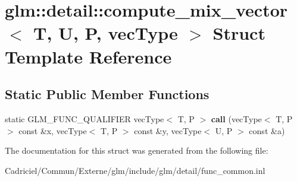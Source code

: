 \hypertarget{structglm_1_1detail_1_1compute__mix__vector}{}\section{glm\+:\+:detail\+:\+:compute\+\_\+mix\+\_\+vector$<$ T, U, P, vec\+Type $>$ Struct Template Reference}
\label{structglm_1_1detail_1_1compute__mix__vector}
\subsection*{Static Public Member Functions}
\begin{DoxyCompactItemize}
\item 
static G\+L\+M\+\_\+\+F\+U\+N\+C\+\_\+\+Q\+U\+A\+L\+I\+F\+I\+ER vec\+Type$<$ T, P $>$ {\bfseries call} (vec\+Type$<$ T, P $>$ const \&x, vec\+Type$<$ T, P $>$ const \&y, vec\+Type$<$ U, P $>$ const \&a)\hypertarget{structglm_1_1detail_1_1compute__mix__vector_a68153ea8943ca1ffac025040a197c590}{}\label{structglm_1_1detail_1_1compute__mix__vector_a68153ea8943ca1ffac025040a197c590}

\end{DoxyCompactItemize}


The documentation for this struct was generated from the following file\+:\begin{DoxyCompactItemize}
\item 
Cadriciel/\+Commun/\+Externe/glm/include/glm/detail/func\+\_\+common.\+inl\end{DoxyCompactItemize}
